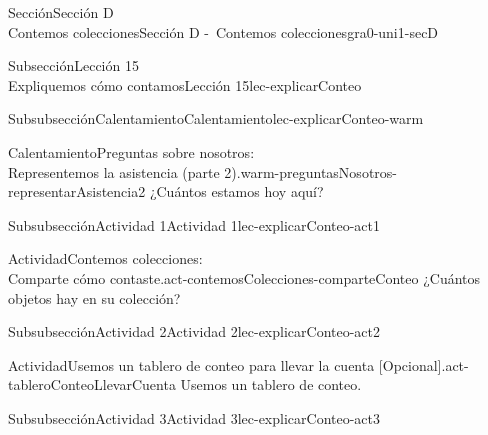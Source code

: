 \begin{sectionptx}{Sección}{{\Large Sección D\\}Contemos colecciones}{}{Sección D -~Contemos colecciones}{}{}{gra0-uni1-secD}
\begin{subsectionptx}{Subsección}{{\normalsize Lección 15\\[-0.05cm]}Expliquemos cómo contamos}{}{Lección 15}{}{}{lec-explicarConteo}
\typeout{************************************************}
%
\begin{subsubsectionptx}{Subsubsección}{Calentamiento}{}{Calentamiento}{}{}{lec-explicarConteo-warm}
\begin{exploration}{Calentamiento}{Preguntas sobre nosotros:\\Representemos la asistencia (parte 2).}{warm-preguntasNosotros-representarAsistencia2}%
¿Cuántos estamos hoy aquí?%
\end{exploration}%
\end{subsubsectionptx}
%
%
\typeout{************************************************}
\typeout{************************************************}
%
\begin{subsubsectionptx}{Subsubsección}{Actividad 1}{}{Actividad 1}{}{}{lec-explicarConteo-act1}
\begin{activity}{Actividad}{Contemos colecciones:\\Comparte cómo contaste.}{act-contemosColecciones-comparteConteo}%
¿Cuántos objetos hay en su colección?%
\end{activity}%
\end{subsubsectionptx}
%
%
\typeout{************************************************}
\typeout{************************************************}
%
\begin{subsubsectionptx}{Subsubsección}{Actividad 2}{}{Actividad 2}{}{}{lec-explicarConteo-act2}
\begin{activity}{Actividad}{Usemos un tablero de conteo para llevar la cuenta [Opcional].}{act-tableroConteoLlevarCuenta}%
Usemos un tablero de conteo.%
\end{activity}%
\end{subsubsectionptx}
%
%
\typeout{************************************************}
\typeout{************************************************}
%
\clearpage
\begin{subsubsectionptx}{Subsubsección}{Actividad 3}{}{Actividad 3}{}{}{lec-explicarConteo-act3}

\end{subsubsectionptx}
\end{subsectionptx}
\end{sectionptx}
